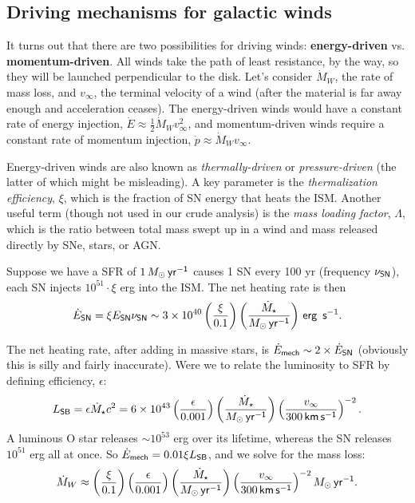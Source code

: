 \documentclass{tufte-handout}
\renewcommand{\textbf}[1]{{\bf \textcolor{dark-gray}{#1}}}
\renewcommand{\rm}{\sf}
\renewcommand{\textrm}{\textsf}
\newcommand{\e}[1]{\times 10^{#1}}
\begin{document}
\subsection{Driving mechanisms for galactic winds}
It turns out that there are two possibilities for driving winds: \textbf{energy-driven} vs. \textbf{momentum-driven}. All winds take the path of least resistance, by the way, so they will be launched perpendicular to the disk. Let's consider $\dot M_W$, the rate of mass loss, and $v_\infty$, the terminal velocity of a wind (after the material is far away enough and acceleration ceases). The energy-driven winds would have a constant rate of energy injection, $\dot E \approx \frac{1}{2}\dot M_W v_\infty^2$, and momentum-driven winds require a constant rate of momentum injection, $\dot p \approx \dot M_W v_\infty$.

Energy-driven winds are also known as \textit{thermally-driven} or \textit{pressure-driven} (the latter of which might be misleading). A key parameter is the \textit{thermalization efficiency}, $\xi$, which is the fraction of SN energy that heats the ISM. Another useful term (though not used in our crude analysis) is the \textit{mass loading factor}, $\Lambda$, which is the ratio between total mass swept up in a wind and mass released directly by SNe, stars, or AGN.

Suppose we have a SFR of $1\, M_\odot\,\rm yr^{-1}$ causes 1 SN every 100 yr (frequency $\nu_{\rm SN}$), each SN injects $10^{51} \cdot \xi $ erg into the ISM. The net heating rate is then
\begin{equation}
\dot E_{\rm SN} = \xi E_{\rm SN} \nu_{\rm SN} \sim 3\e{40} \left (\frac{\xi}{0.1}\right )\left (\frac{\dot M_\star}{M_\odot\, \rm yr^{-1}}\right ) \textrm{\,erg\, s}^{-1}.
\end{equation}

The net heating rate, after adding in massive stars, is $\dot E_{\rm mech} \sim 2 \times \dot E_{\rm SN}$ (obviously this is silly and fairly inaccurate). Were we to relate the luminosity to SFR by defining efficiency, $\epsilon$:
\begin{equation}
L_{\rm SB} = \epsilon \dot M_\star c^2 = 6\e{43} \left (\frac{\epsilon}{0.001}\right )\left (\frac{\dot M_\star}{M_\odot\, \rm yr^{-1}}\right )\left (\frac{v_\infty}{300\, \rm km \, s^{-1}}\right )^{-2}.
\end{equation}
A luminous O star releases $\sim 10^{53}$ erg over its lifetime, whereas the SN releases $10^{51}$ erg all at once. So $\dot E_{\rm mech} = 0.01 \xi L_{\rm SB}$, and we solve for the mass loss:
\begin{equation}
\label{eq:energy driven outflow}
\dot M_W \approx \left (\frac{\xi}{0.1}\right )\left (\frac{\epsilon}{0.001}\right )\left (\frac{\dot M_\star}{M_\odot \, \rm yr^{-1}}\right )\left (\frac{v_\infty}{300\, \rm km \, s^{-1}}\right )^{-2} M_\odot \rm\, yr^{-1}.
\end{equation}
\end{document}
